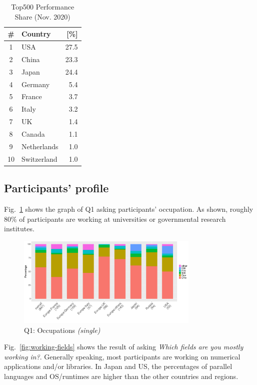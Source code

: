 \documentclass[preprint,5p,times]{elsarticle}
\def\myquote#1{{\it #1}}
\begin{document}
\begin{table}%
\begin{center}%
  \caption{Top500 Performance Share (Nov. 2020)}%
  \label{tab:top500-share}%
  \begin{tabular}{c|l|r}%
    \hline%
    \# & Country & [\%] \\%
    \hline%
    1  & USA 	  & 27.5 \\%
    2  & China 	  & 23.3 \\%
    3  & Japan 	  & 24.4 \\%
    4  & Germany  &  5.4 \\%
    5  & France	  &  3.7 \\%
    6  & Italy	  &  3.2 \\%
    7  & UK	  &  1.4 \\%
    8  & Canada	  &  1.1 \\%
    9  & Netherlands  & 1.0 \\%
    10 & Switzerland  & 1.0 \\%
    \hline%
  \end{tabular}%
\end{center}%
\end{table}%

\subsection*{Participants' profile}

Fig.~\ref{fig:occupations} shows the graph of Q1 asking participants'
occupation. As shown, roughly 80\% of participants are working at
universities or governmental research institutes.
%
\begin{figure}[htb]
  \begin{center}
    \includegraphics[width=8.7cm]{R-scripts/Q1.pdf}
    \caption{Q1: Occupations {\it(single)}}
    \label{fig:occupations}
  \end{center}
\end{figure}

Fig.~\ref{fig:working-fields} shows the result of asking \myquote{Which
fields are you mostly working in?}. Generally speaking, most
participants are working on numerical applications and/or
libraries. In Japan and US, the percentages of parallel languages and
OS/runtimes are higher than the other countries and regions.
\end{document}
